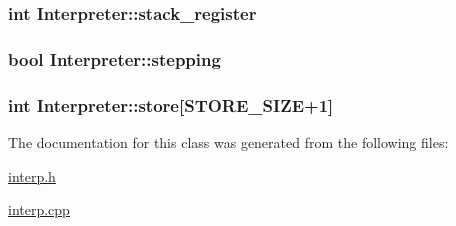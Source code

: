 \label{classInterpreter_ac2b2272e7e93df082733e94d0c2e39df}
\hypertarget{classInterpreter_adceea023d2b221e04ccc84ce0260301e}{
\subsubsection[{stack\_\-register}]{\setlength{\rightskip}{0pt plus 5cm}int {\bf Interpreter::stack\_\-register}}}
\label{classInterpreter_adceea023d2b221e04ccc84ce0260301e}
\hypertarget{classInterpreter_a55aac45fbc90e77dac77042f269009ad}{
\subsubsection[{stepping}]{\setlength{\rightskip}{0pt plus 5cm}bool {\bf Interpreter::stepping}}}
\label{classInterpreter_a55aac45fbc90e77dac77042f269009ad}
\hypertarget{classInterpreter_af320a034984d7ea210a546c9d0313443}{
\subsubsection[{store}]{\setlength{\rightskip}{0pt plus 5cm}int {\bf Interpreter::store}\mbox{[}{\bf STORE\_\-SIZE}+1\mbox{]}}}
\label{classInterpreter_af320a034984d7ea210a546c9d0313443}


The documentation for this class was generated from the following files:\begin{DoxyCompactItemize}
\item 
\hyperlink{interp_8h}{interp.h}\item 
\hyperlink{interp_8cpp}{interp.cpp}\end{DoxyCompactItemize}
